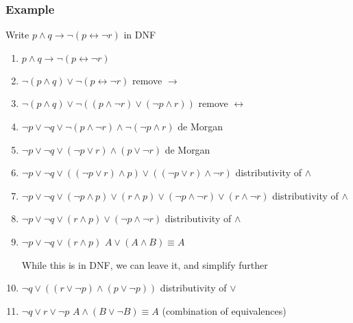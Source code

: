 \documentclass[a4paper, 12pt]{article}
\begin{document}
            \subsubsection*{Example}
                Write $p \land q \rightarrow \neg (p \leftrightarrow \neg r)$ in DNF
                \begin{enumerate}[1.]
                    \itemsep0em
                    \item $p \land q \rightarrow \neg (p \leftrightarrow \neg r)$
                    \item $\neg (p \land q) \lor \neg (p \leftrightarrow \neg r)$ \hfill remove $\rightarrow$
                    \item $\neg (p \land q) \lor \neg ((p \land \neg r) \lor (\neg p \land r))$ \hfill remove $\leftrightarrow$
                    \item $\neg p \lor \neg q \lor \neg (p \land \neg r) \land \neg (\neg p \land r)$ \hfill de Morgan
                    \item $\neg p \lor \neg q \lor (\neg p \lor r) \land (p \lor \neg r)$ \hfill de Morgan
                    \item $\neg p \lor \neg q \lor ((\neg p \lor r) \land p) \lor ((\neg p \lor r) \land \neg r)$ \hfill distributivity of $\land$
                    \item $\neg p \lor \neg q \lor (\neg p \land p) \lor (r \land p) \lor (\neg p \land \neg r) \lor (r \land \neg r)$ \hfill distributivity of $\land$
                    \item $\neg p \lor \neg q \lor (r \land p) \lor (\neg p \land \neg r)$ \hfill distributivity of $\land$
                    \item $\neg p \lor \neg q \lor (r \land p)$ \hfill $A \lor (A \land B) \equiv A$
                    \medskip

                    While this is in DNF, we can leave it, and simplify further
                    \item $\neg q \lor ((r \lor \neg p) \land (p \lor \neg p))$ \hfill distributivity of $\lor$
                    \item $\neg q \lor r \lor \neg p$ \hfill $A \land (B \lor \neg B) \equiv A$ (combination of equivalences)
                \end{enumerate}
\end{document}
